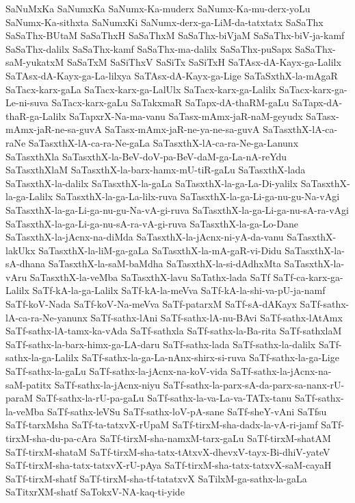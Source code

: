 {SaNuMxKa
SaNumxKa
SaNumx-Ka-muderx
SaNumx-Ka-mu-derx-yoLu
SaNumx-Ka-sithxta
SaNumxKi
SaNumx-derx-ga-LiM-da-tatxtatx
SaSaThx
SaSaThx-BUtaM
SaSaThxH
SaSaThxM
SaSaThx-biVjaM
SaSaThx-biV-ja-kamf
SaSaThx-dalilx
SaSaThx-kamf
SaSaThx-ma-dalilx
SaSaThx-puSapx
SaSaThx-saM-yukatxM
SaSaTxM
SaSiThxV
SaSiTx
SaSiTxH
SaTAsx-dA-Kayx-ga-Lalilx
SaTAsx-dA-Kayx-ga-La-lilxya
SaTAsx-dA-Kayx-ga-Lige
SaTaSxthX-la-mAgaR
SaTacx-karx-gaLa
SaTacx-karx-ga-LalUlx
SaTacx-karx-ga-Lalilx
SaTacx-karx-ga-Le-ni-suva
SaTacx-karx-gaLu
SaTakxmaR
SaTapx-dA-thaRM-gaLu
SaTapx-dA-thaR-ga-Lalilx
SaTapxrX-Na-ma-vanu
SaTasx-mAmx-jaR-naM-geyudx
SaTasx-mAmx-jaR-ne-sa-guvA
SaTasx-mAmx-jaR-ne-ya-ne-sa-guvA
SaTasxthX-lA-ca-raNe
SaTasxthX-lA-ca-ra-Ne-gaLa
SaTasxthX-lA-ca-ra-Ne-ga-Lanunx
SaTasxthXla
SaTasxthX-la-BeV-doV-pa-BeV-daM-ga-La-nA-reYdu
SaTasxthXlaM
SaTasxthX-la-barx-hamx-mU-tiR-gaLu
SaTasxthX-lada
SaTasxthX-la-dalilx
SaTasxthX-la-gaLa
SaTasxthX-la-ga-La-Di-yalilx
SaTasxthX-la-ga-Lalilx
SaTasxthX-la-ga-La-lilx-ruva
SaTasxthX-la-ga-Li-ga-nu-gu-Na-vAgi
SaTasxthX-la-ga-Li-ga-nu-gu-Na-vA-gi-ruva
SaTasxthX-la-ga-Li-ga-nu-sA-ra-vAgi
SaTasxthX-la-ga-Li-ga-nu-sA-ra-vA-gi-ruva
SaTasxthX-la-ga-Lo-Dane
SaTasxthX-la-jAcnx-na-diMda
SaTasxthX-la-jAcnx-ni-yA-da-vanu
SaTasxthX-lakUkx
SaTasxthX-la-liM-ga-gaLa
SaTasxthX-la-mA-gaR-vi-Didu
SaTasxthX-la-sA-dhana
SaTasxthX-la-saM-baMdha
SaTasxthX-la-si-dAdhxMta
SaTasxthX-la-vAru
SaTasxthX-la-veMba
SaTasxthX-lavu
SaTathx-lada
SaTf
SaTf-ca-karx-ga-Lalilx
SaTf-kA-la-ga-Lalilx
SaTf-kA-la-meVva
SaTf-kA-la-shi-va-pU-ja-namf
SaTf-koV-Nada
SaTf-koV-Na-meVva
SaTf-patarxM
SaTf-sA-dAKayx
SaTf-sathx-lA-ca-ra-Ne-yanunx
SaTf-sathx-lAni
SaTf-sathx-lA-nu-BAvi
SaTf-sathx-lAtAmx
SaTf-sathx-lA-tamx-ka-vAda
SaTf-sathxla
SaTf-sathx-la-Ba-rita
SaTf-sathxlaM
SaTf-sathx-la-barx-himx-ga-LA-daru
SaTf-sathx-lada
SaTf-sathx-la-dalilx
SaTf-sathx-la-ga-Lalilx
SaTf-sathx-la-ga-La-nAnx-shirx-si-ruva
SaTf-sathx-la-ga-Lige
SaTf-sathx-la-gaLu
SaTf-sathx-la-jAcnx-na-koV-vida
SaTf-sathx-la-jAcnx-na-saM-patitx
SaTf-sathx-la-jAcnx-niyu
SaTf-sathx-la-parx-sA-da-parx-sa-nanx-rU-paraM
SaTf-sathx-la-rU-pa-gaLu
SaTf-sathx-la-va-La-va-TATx-tanu
SaTf-sathx-la-veMba
SaTf-sathx-leVSu
SaTf-sathx-loV-pA-sane
SaTf-sheY-vAni
SaTfsu
SaTf-tarxMsha
SaTf-ta-tatxvX-rUpaM
SaTf-tirxM-sha-dadx-la-vA-ri-jamf
SaTf-tirxM-sha-du-pa-cAra
SaTf-tirxM-sha-namxM-tarx-gaLu
SaTf-tirxM-shatAM
SaTf-tirxM-shataM
SaTf-tirxM-sha-tatx-tAtxvX-dhevxV-tayx-Bi-dhiV-yateV
SaTf-tirxM-sha-tatx-tatxvX-rU-pAya
SaTf-tirxM-sha-tatx-tatxvX-saM-cayaH
SaTf-tirxM-shatf
SaTf-tirxM-sha-tf-tatatxvX
SaTilxM-ga-sathx-la-gaLa
SaTitxrXM-shatf
SaTokxV-NA-kaq-ti-yide
}
